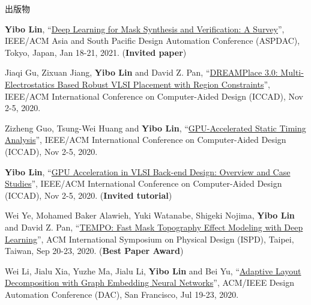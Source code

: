 \begin{rSection}{出版物}
\begin{description}[font=\normalfont, rightmargin=2em]
{}
            

\item[{[C43]}]{
        \textbf{Yibo Lin}, 
    ``\href{https://doi.org/10.1145/3394885.3431624}{Deep Learning for Mask Synthesis and Verification: A Survey}'', 
    IEEE/ACM Asia and South Pacific Design Automation Conference (ASPDAC), Tokyo, Japan, Jan 18-21, 2021.
    (\textbf{Invited paper})
}
            

\item[{[C42]}]{
        Jiaqi Gu, Zixuan Jiang, \textbf{Yibo Lin} and David Z. Pan, 
    ``\href{https://doi.org/10.1145/3400302.3415691}{DREAMPlace 3.0: Multi-Electrostatics Based Robust VLSI Placement with Region Constraints}'', 
    IEEE/ACM International Conference on Computer-Aided Design (ICCAD), Nov 2-5, 2020.
    
}
            

\item[{[C41]}]{
        Zizheng Guo, Tsung-Wei Huang and \textbf{Yibo Lin}, 
    ``\href{https://doi.org/10.1145/3400302.3415631}{GPU-Accelerated Static Timing Analysis}'', 
    IEEE/ACM International Conference on Computer-Aided Design (ICCAD), Nov 2-5, 2020.
    
}
            

\item[{[C40]}]{
        \textbf{Yibo Lin}, 
    ``\href{https://doi.org/10.1145/3400302.3415765}{GPU Acceleration in VLSI Back-end Design: Overview and Case Studies}'', 
    IEEE/ACM International Conference on Computer-Aided Design (ICCAD), Nov 2-5, 2020.
    (\textbf{Invited tutorial})
}
            

\item[{[C39]}]{
        Wei Ye, Mohamed Baker Alawieh, Yuki Watanabe, Shigeki Nojima, \textbf{Yibo Lin} and David Z. Pan, 
    ``\href{https://doi.org/10.1145/3372780.3375565}{TEMPO: Fast Mask Topography Effect Modeling with Deep Learning}'', 
    ACM International Symposium on Physical Design (ISPD), Taipei, Taiwan, Sep 20-23, 2020.
    (\textbf{Best Paper Award})
}
            

\item[{[C38]}]{
        Wei Li, Jialu Xia, Yuzhe Ma, Jialu Li, \textbf{Yibo Lin} and Bei Yu, 
    ``\href{https://doi.org/10.1109/DAC18072.2020.9218706}{Adaptive Layout Decomposition with Graph Embedding Neural Networks}'', 
    ACM/IEEE Design Automation Conference (DAC), San Francisco, Jul 19-23, 2020.
    
}
            


\end{description}
\end{rSection}
